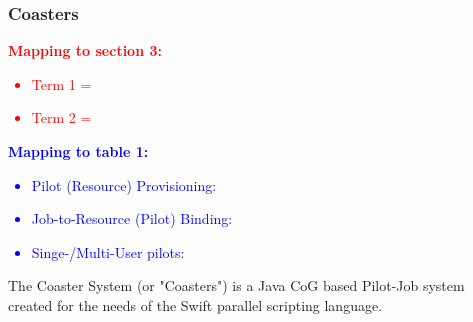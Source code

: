 \documentclass{sig-alternate}
\begin{document}


%
\subsubsection{Coasters}

\textcolor{red}
{
\textbf{Mapping to section 3:}
\begin{itemize}
\item Term 1 =
\item Term 2 =
\end{itemize}
}

\textcolor{blue}
{
\textbf{Mapping to table 1:}
\begin{itemize}
\item Pilot (Resource) Provisioning:
\item Job-to-Resource (Pilot) Binding:
\item Singe-/Multi-User pilots:
\end{itemize}
}


The Coaster System (or "Coasters") is a Java CoG based Pilot-Job system
created for the needs of the Swift parallel scripting language.
\end{document}
